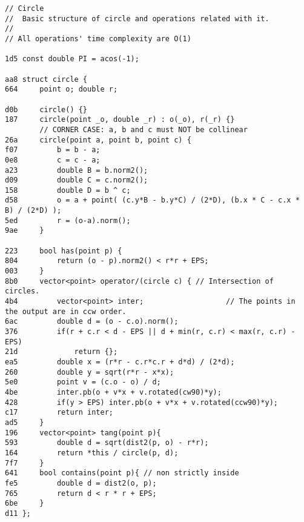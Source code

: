 \documentclass[11pt, a4paper, twoside]{article}
\begin{document}
\begin{lstlisting}
// Circle
//  Basic structure of circle and operations related with it.
// 
// All operations' time complexity are O(1)

1d5 const double PI = acos(-1);

aa8 struct circle {
664 	point o; double r;
    
d0b 	circle() {}
187 	circle(point _o, double _r) : o(_o), r(_r) {}
    	// CORNER CASE: a, b and c must NOT be collinear
26a 	circle(point a, point b, point c) {
f07 		b = b - a;
0e8 		c = c - a;
a23 		double B = b.norm2();
d09 		double C = c.norm2();
158 		double D = b ^ c;
d58 		o = a + point( (c.y*B - b.y*C) / (2*D), (b.x * C - c.x * B) / (2*D) );
5ed 		r = (o-a).norm();
9ae 	}
    
223 	bool has(point p) { 
804 		return (o - p).norm2() < r*r + EPS;
003 	}
8b0 	vector<point> operator/(circle c) { // Intersection of circles.
4b4 		vector<point> inter;                   // The points in the output are in ccw order.
6ac 		double d = (o - c.o).norm();
376 		if(r + c.r < d - EPS || d + min(r, c.r) < max(r, c.r) - EPS)
21d 			return {};
ea5 		double x = (r*r - c.r*c.r + d*d) / (2*d);
260 		double y = sqrt(r*r - x*x);
5e0 		point v = (c.o - o) / d;
4be 		inter.pb(o + v*x + v.rotated(cw90)*y);
428 		if(y > EPS) inter.pb(o + v*x + v.rotated(ccw90)*y);
c17 		return inter;
ad5 	}
196 	vector<point> tang(point p){
593 		double d = sqrt(dist2(p, o) - r*r);
164 		return *this / circle(p, d);
7f7 	}
641 	bool contains(point p){ // non strictly inside
fe5 		double d = dist2(o, p);
765 		return d < r * r + EPS;
6be 	}
d11 };
\end{lstlisting}
\end{document}
